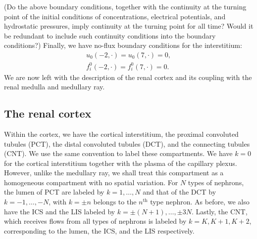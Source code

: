 \documentclass{article}
\begin{document}
{\color{red}(Do the above boundary conditions, together with the continuity at the turning point of the initial conditions of concentrations, electrical potentials, and hydrostatic pressures, imply continuity at the turning point for all time?
Would it be redundant to include such continuity conditions into the boundary conditions?)}
Finally, we have no-flux boundary conditions for the interstitium:
\begin{gather}
    u_0(-2,\cdot) = u_0(7,\cdot)=0,\\
    f_i^0(-2,\cdot) = f_i^0(7,\cdot) = 0.
\end{gather}
We are now left with the description of the renal cortex and its coupling with the renal medulla and medullary ray.

\subsection{The renal cortex}

Within the cortex, we have the cortical interstitium, the proximal convoluted tubules (PCT), the distal convoluted tubules (DCT), and the connecting tubules (CNT).
We use the same convention to label these compartments.
We have $k=0$ for the cortical interstitium together with the plasma of the capillary plexus.
However, unlike the medullary ray, we shall treat this compartment as a homogeneous compartment with no spatial variation.
For $N$ types of nephrons, the lumen of PCT are labeled by $k=1,\dots,N$ and that of the DCT by $k=-1,\dots,-N$, with $k=\pm n$ belongs to the $n^{\mathrm{th}}$ type nephron.
As before, we also have the ICS and the LIS labeled by $k=\pm(N+1),\dots,\pm 3N$.
Lastly, the CNT, which receives flows from all types of nephrons is labeled by $k=K,K+1,K+2$, corresponding to the lumen, the ICS, and the LIS respectively.
\end{document}
